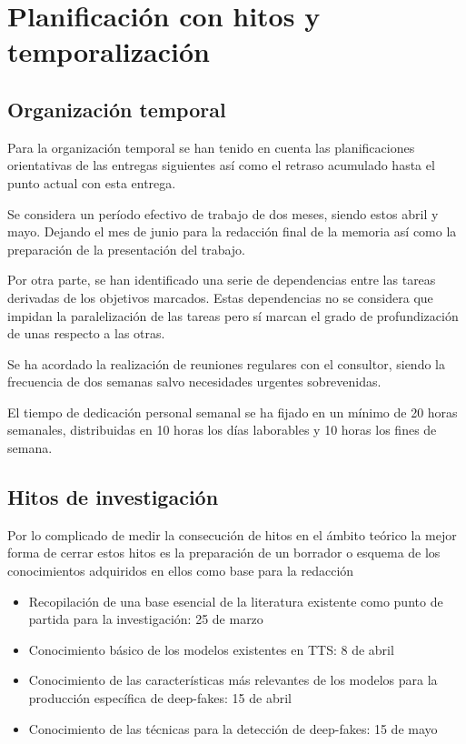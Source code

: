 \section{Planificación con hitos y temporalización}


\subsection{Organización temporal}

Para la organización temporal se han tenido en cuenta las planificaciones orientativas de las entregas siguientes así como el retraso acumulado hasta el punto actual con esta entrega.

Se considera un período efectivo de trabajo de dos meses, siendo estos abril y mayo. Dejando el mes de junio para la redacción final de la memoria así como la preparación de la presentación del trabajo.

Por otra parte, se han identificado una serie de dependencias entre las tareas derivadas de los objetivos marcados. Estas dependencias no se considera que impidan la paralelización de las tareas pero sí marcan el grado de profundización de unas respecto a las otras.

Se ha acordado la realización de reuniones regulares con el consultor, siendo la frecuencia de dos semanas salvo necesidades urgentes sobrevenidas.

El tiempo de dedicación personal semanal se ha fijado en un mínimo de 20 horas semanales, distribuidas en 10 horas los días laborables y 10 horas los fines de semana. 

\subsection{Hitos de investigación}

Por lo complicado de medir la consecución de hitos en el ámbito teórico la mejor forma de cerrar estos hitos es la preparación de un borrador o esquema de los conocimientos adquiridos en ellos como base para la redacción 

\begin{itemize}
    \item Recopilación de una base esencial de la literatura existente como punto de partida para la investigación: 25 de marzo
    \item Conocimiento básico de los modelos existentes en TTS: 8 de abril
    \item Conocimiento de las características más relevantes de los modelos para la producción específica de deep-fakes: 15 de abril
    \item Conocimiento de las técnicas para la detección de deep-fakes: 15 de mayo
\end{itemize}

